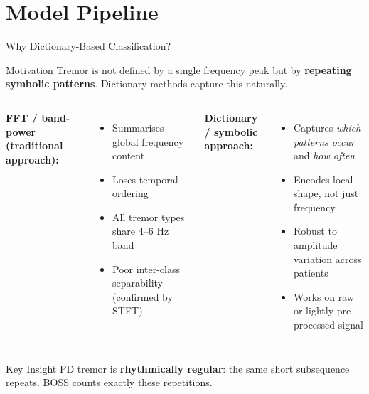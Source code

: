 \documentclass[aspectratio=169, 11pt]{beamer}
\begin{document}
\section{Model Pipeline}

\begin{frame}{Why Dictionary-Based Classification?}
  \begin{exampleblock}{Motivation}
    \small
    Tremor is not defined by a single frequency peak but by
    \textbf{repeating symbolic patterns}. Dictionary methods capture this naturally.
  \end{exampleblock}

  \vspace{0.4em}
  \begin{columns}[T]
      \small
      \textbf{FFT / band-power (traditional approach):}
      \begin{itemize}
        \item Summarises global frequency content
        \item Loses temporal ordering
        \item All tremor types share 4--6 Hz band
        \item Poor inter-class separability (confirmed by STFT)
      \end{itemize}
      \small
      \textbf{Dictionary / symbolic approach:}
      \begin{itemize}
        \item Captures \emph{which patterns occur} and \emph{how often}
        \item Encodes local shape, not just frequency
        \item Robust to amplitude variation across patients
        \item Works on raw or lightly pre-processed signal
      \end{itemize}
  \end{columns}

  \vspace{0.4em}
  \begin{alertblock}{Key Insight}
    \small
    PD tremor is \textbf{rhythmically regular}: the same short subsequence
    repeats. BOSS counts exactly these repetitions.
  \end{alertblock}
\end{frame}
\end{document}
